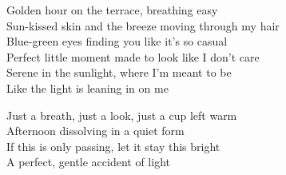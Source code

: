 \begin{lyrics}
Golden hour on the terrace, breathing easy\\
Sun-kissed skin and the breeze moving through my hair\\
Blue-green eyes finding you like it’s so casual\\
Perfect little moment made to look like I don’t care\\
Serene in the sunlight, where I’m meant to be\\
Like the light is leaning in on me

Just a breath, just a look, just a cup left warm\\
Afternoon dissolving in a quiet form\\
If this is only passing, let it stay this bright\\
A perfect, gentle accident of light
\end{lyrics}

